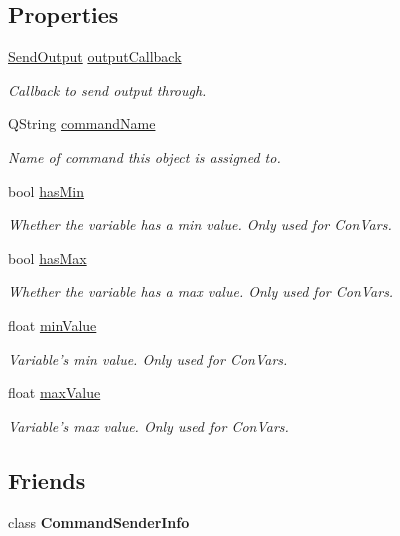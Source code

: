 \subsection*{Properties}
\begin{DoxyCompactItemize}
\item 
\hyperlink{class_command_sender_info_a68c494ef69a25ac7bf667b83e24639ed}{Send\-Output} \hyperlink{class_command_sender_info_af04b4cc7b75a48a4583411c1c130d654}{output\-Callback}
\begin{DoxyCompactList}\small\item\em Callback to send output through. \end{DoxyCompactList}\item 
Q\-String \hyperlink{class_command_sender_info_af9825e2019cac0c5c9793eefe8086b6c}{command\-Name}
\begin{DoxyCompactList}\small\item\em Name of command this object is assigned to. \end{DoxyCompactList}\item 
bool \hyperlink{class_command_sender_info_a9f34e6eb3bab0b16dff37fdacd82695e}{has\-Min}
\begin{DoxyCompactList}\small\item\em Whether the variable has a min value. Only used for Con\-Vars. \end{DoxyCompactList}\item 
bool \hyperlink{class_command_sender_info_ae003e4ee143379be99e52bbe6dce3a69}{has\-Max}
\begin{DoxyCompactList}\small\item\em Whether the variable has a max value. Only used for Con\-Vars. \end{DoxyCompactList}\item 
float \hyperlink{class_command_sender_info_a7279460303b092c8d78735bd33e94ae0}{min\-Value}
\begin{DoxyCompactList}\small\item\em Variable's min value. Only used for Con\-Vars. \end{DoxyCompactList}\item 
float \hyperlink{class_command_sender_info_ac5b816de5b4e61339e0b649bd8f58799}{max\-Value}
\begin{DoxyCompactList}\small\item\em Variable's max value. Only used for Con\-Vars. \end{DoxyCompactList}\end{DoxyCompactItemize}
\subsection*{Friends}
\begin{DoxyCompactItemize}
\item 
\hypertarget{class_command_sender_info_a5ee157709621d8775061d944a62ed7fa}{class {\bfseries Command\-Sender\-Info}}\label{class_command_sender_info_a5ee157709621d8775061d944a62ed7fa}

\end{DoxyCompactItemize}


